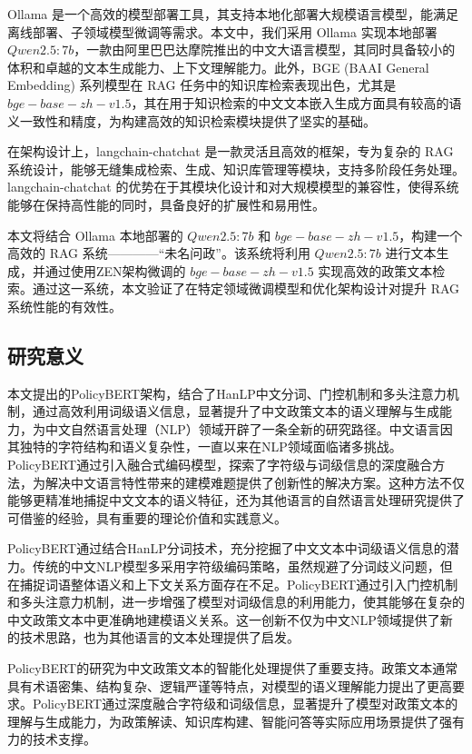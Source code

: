 \documentclass[12pt, a4paper]{ctexart}
\begin{document}
Ollama 是一个高效的模型部署工具，其支持本地化部署大规模语言模型，能满足离线部署、子领域模型微调等需求。本文中，我们采用 Ollama 实现本地部署 $Qwen2.5:7b$，一款由阿里巴巴达摩院推出的中文大语言模型，其同时具备较小的体积和卓越的文本生成能力、上下文理解能力\cite{qwen2.5}。此外，BGE (BAAI General Embedding) 系列模型在 RAG 任务中的知识库检索表现出色，尤其是 $ bge-base-zh-v1.5 $，其在用于知识检索的中文文本嵌入生成方面具有较高的语义一致性和精度，为构建高效的知识检索模块提供了坚实的基础。

在架构设计上，langchain-chatchat 是一款灵活且高效的框架，专为复杂的 RAG 系统设计，能够无缝集成检索、生成、知识库管理等模块，支持多阶段任务处理\cite{langchainchatchat}。langchain-chatchat 的优势在于其模块化设计和对大规模模型的兼容性，使得系统能够在保持高性能的同时，具备良好的扩展性和易用性。

本文将结合 Ollama 本地部署的 $Qwen2.5:7b$ 和 $ bge-base-zh-v1.5 $，构建一个高效的 RAG 系统————“未名问政”。该系统将利用 $Qwen2.5:7b$ 进行文本生成，并通过使用ZEN架构微调的 $ bge-base-zh-v1.5 $ 实现高效的政策文本检索。通过这一系统，本文验证了在特定领域微调模型和优化架构设计对提升 RAG 系统性能的有效性。

\subsection{研究意义}
本文提出的PolicyBERT架构，结合了HanLP中文分词、门控机制和多头注意力机制，通过高效利用词级语义信息，显著提升了中文政策文本的语义理解与生成能力，为中文自然语言处理（NLP）领域开辟了一条全新的研究路径。中文语言因其独特的字符结构和语义复杂性，一直以来在NLP领域面临诸多挑战。PolicyBERT通过引入融合式编码模型，探索了字符级与词级信息的深度融合方法，为解决中文语言特性带来的建模难题提供了创新性的解决方案。这种方法不仅能够更精准地捕捉中文文本的语义特征，还为其他语言的自然语言处理研究提供了可借鉴的经验，具有重要的理论价值和实践意义。

PolicyBERT通过结合HanLP分词技术，充分挖掘了中文文本中词级语义信息的潜力。传统的中文NLP模型多采用字符级编码策略，虽然规避了分词歧义问题，但在捕捉词语整体语义和上下文关系方面存在不足。PolicyBERT通过引入门控机制和多头注意力机制，进一步增强了模型对词级信息的利用能力，使其能够在复杂的中文政策文本中更准确地建模语义关系。这一创新不仅为中文NLP领域提供了新的技术思路，也为其他语言的文本处理提供了启发。

PolicyBERT的研究为中文政策文本的智能化处理提供了重要支持。政策文本通常具有术语密集、结构复杂、逻辑严谨等特点，对模型的语义理解能力提出了更高要求。PolicyBERT通过深度融合字符级和词级信息，显著提升了模型对政策文本的理解与生成能力，为政策解读、知识库构建、智能问答等实际应用场景提供了强有力的技术支撑。
\end{document}
